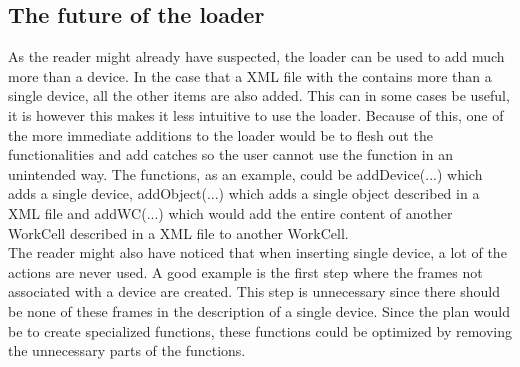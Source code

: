 \subsection{The future of the loader}
\label{subsec:futureLoader}
As the reader might already have suspected, the loader can be used to add much more than a device. In the case that a XML file with the contains more than a single device, all the other items are also added. This can in some cases be useful, it is however this makes it less intuitive to use the loader. Because of this, one of the more immediate additions to the loader would be to flesh out the functionalities and add catches so the user cannot use the function in an unintended way. The functions, as an example, could be addDevice(...) which adds a single device, addObject(...) which adds a single object described in a XML file and addWC(...) which would add the entire content of another WorkCell described in a XML file to another WorkCell.\\
The reader might also have noticed that when inserting single device, a lot of the actions are never used. A good example is the first step where the frames not associated with a device are created. This step is unnecessary since there should be none of these frames in the description of a single device. Since the plan would be to create specialized functions, these functions could be optimized by removing the unnecessary parts of the functions.
